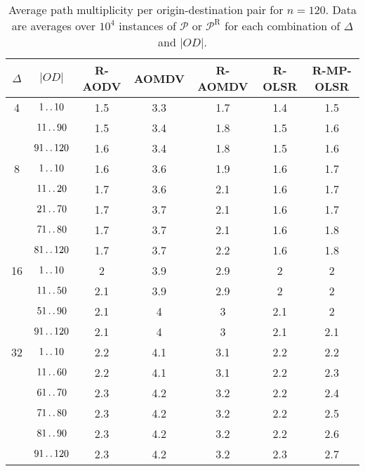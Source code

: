 \documentclass{article}
\newcommand{\twoldots}{\mathinner{\ldotp\ldotp}}
\begin{document}
\begin{table}[t]
\centering
\caption{Average path multiplicity per origin-destination pair for $n=120$. Data
are averages over $10^4$ instances of $\mathcal{P}$ or $\mathcal{P}^\mathrm{R}$
for each combination of $\Delta$ and $\vert OD\vert$.}
\small
\begin{tabular}{ccccccc}
\hline
$\Delta$ & $\vert OD\vert $ & R-AODV & AOMDV & R-AOMDV & R-OLSR & R-MP-OLSR \\ \hline
4        & $1\twoldots 10$   & 1.5    & 3.3   & 1.7     & 1.4    & 1.5 \\
         & $11\twoldots 90$  & 1.5    & 3.4   & 1.8     & 1.5    & 1.6 \\
         & $91\twoldots 120$ & 1.6    & 3.4   & 1.8     & 1.5    & 1.6 \\ \hline
8        & $1\twoldots 10$   & 1.6    & 3.6   & 1.9     & 1.6    & 1.7 \\
         & $11\twoldots 20$  & 1.7    & 3.6   & 2.1     & 1.6    & 1.7 \\
         & $21\twoldots 70$  & 1.7    & 3.7   & 2.1     & 1.6    & 1.7 \\
         & $71\twoldots 80$  & 1.7    & 3.7   & 2.1     & 1.6    & 1.8 \\
         & $81\twoldots 120$ & 1.7    & 3.7   & 2.2     & 1.6    & 1.8 \\ \hline
16       & $1\twoldots 10$   & 2      & 3.9   & 2.9     & 2      & 2   \\
         & $11\twoldots 50$  & 2.1    & 3.9   & 2.9     & 2      & 2   \\
         & $51\twoldots 90$  & 2.1    & 4     & 3       & 2.1    & 2   \\
         & $91\twoldots 120$ & 2.1    & 4     & 3       & 2.1    & 2.1 \\ \hline
32       & $1\twoldots 10$   & 2.2    & 4.1   & 3.1     & 2.2    & 2.2 \\
         & $11\twoldots 60$  & 2.2    & 4.1   & 3.1     & 2.2    & 2.3 \\
         & $61\twoldots 70$  & 2.3    & 4.2   & 3.2     & 2.2    & 2.4 \\
         & $71\twoldots 80$  & 2.3    & 4.2   & 3.2     & 2.2    & 2.5 \\
         & $81\twoldots 90$  & 2.3    & 4.2   & 3.2     & 2.2    & 2.6 \\
         & $91\twoldots 120$ & 2.3    & 4.2   & 3.2     & 2.3    & 2.7 \\ \hline
\end{tabular}
 \label{table3}
\end{table}
\end{document}
